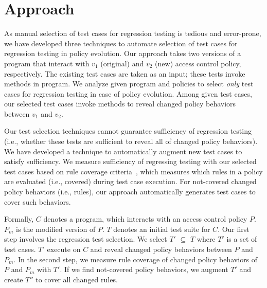 \section{Approach}
\label{sec:approach}
As manual selection of test cases for regression testing is tedious and error-prone, we have developed three techniques to automate 
selection of test cases for regression testing in policy evolution.
Our approach takes two versions of a program that interact with $v_1$ (original) and $v_2$ (new) access control policy, 
respectively. The existing test cases are taken as an input; these tests invoke methods in program.
We analyze given program and policies to select \emph{only} test cases for regression testing in case of policy evolution. 
Among given test cases, our selected test cases invoke methods to reveal changed policy behaviors between $v_1$ and $v_2$.

Our test selection techniques cannot guarantee sufficiency of regression 
testing (i.e., whether these tests are sufficient to reveal all of changed policy behaviors). We have developed a technique to 
automatically augment new test cases to satisfy sufficiency. We measure sufficiency of regressing testing with our 
selected test cases based on rule coverage criteria~\cite{martin06:defining}, which measures which rules in a policy are evaluated (i.e., covered) during test case execution. For not-covered changed policy behaviors (i.e., rules), 
our approach automatically generates test cases to cover such behaviors.

Formally, $C$ denotes a program, which interacts with an access control policy $P$. $P_{m}$ is the modified version of $P$. 
$T$ denotes an initial test suite for $C$. Our first step involves the regression test 
selection. We select $T'$ $\subseteq$ $T$ where $T'$ is a set of test cases. $T'$ execute on $C$ and reveal changed policy 
behaviors between $P$ and $P_{m}$. In the second step, we measure rule coverage of changed policy behaviors of $P$ and $P_{m}$ with $T'$. 
If we find not-covered policy behaviors, we augment $T'$ and create $T''$ to cover all changed rules. 

